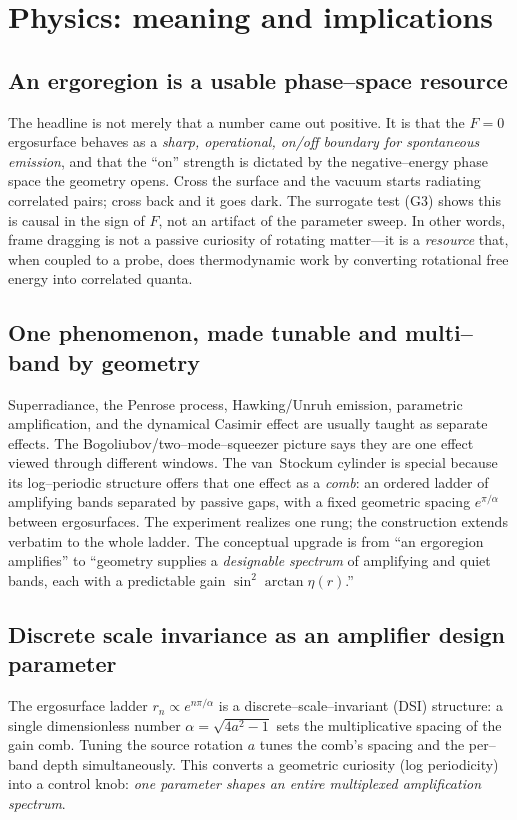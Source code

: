 \documentclass[11pt]{article}
\begin{document}
\section{Physics: meaning and implications}
\label{sec:meaning}

\subsection{An ergoregion is a usable phase--space resource}
The headline is not merely that a number came out positive. It is that the $F=0$ ergosurface
behaves as a \emph{sharp, operational, on/off boundary for spontaneous emission}, and that the
``on'' strength is dictated by the negative--energy phase space the geometry opens. Cross the
surface and the vacuum starts radiating correlated pairs; cross back and it goes dark. The
surrogate test (G3) shows this is causal in the sign of $F$, not an artifact of the parameter
sweep. In other words, frame dragging is not a passive curiosity of rotating matter---it is a
\emph{resource} that, when coupled to a probe, does thermodynamic work by converting rotational
free energy into correlated quanta.

\subsection{One phenomenon, made tunable and multi--band by geometry}
Superradiance, the Penrose process, Hawking/Unruh emission, parametric amplification, and the
dynamical Casimir effect are usually taught as separate effects. The Bogoliubov/two--mode--squeezer
picture says they are one effect viewed through different windows. The van~Stockum cylinder is
special because its log--periodic structure offers that one effect as a \emph{comb}: an ordered
ladder of amplifying bands separated by passive gaps, with a fixed geometric spacing
$e^{\pi/\alpha}$ between ergosurfaces. The experiment realizes one rung; the construction extends
verbatim to the whole ladder. The conceptual upgrade is from ``an ergoregion amplifies'' to
``geometry supplies a \emph{designable spectrum} of amplifying and quiet bands, each with a
predictable gain $\sin^2\!\arctan\eta(r)$.''

\subsection{Discrete scale invariance as an amplifier design parameter}
The ergosurface ladder $r_n\propto e^{n\pi/\alpha}$ is a discrete--scale--invariant (DSI)
structure: a single dimensionless number $\alpha=\sqrt{4a^2-1}$ sets the multiplicative spacing of
the gain comb. Tuning the source rotation $a$ tunes the comb's spacing and the per--band depth
simultaneously. This converts a geometric curiosity (log periodicity) into a control knob:
\emph{one parameter shapes an entire multiplexed amplification spectrum}.
\end{document}
